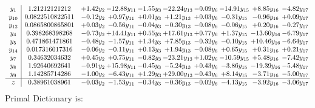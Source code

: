 \documentclass[9pt]{article}
\begin{document}
\[\begin{array}{c| c c@{\hskip 2pt} c@{\hskip 2pt} c@{\hskip 2pt} c@{\hskip 2pt} c@{\hskip 2pt} c@{\hskip 2pt} c@{\hskip 2pt} c@{\hskip 2pt} }
 y_{1}   &  1.21212121212 & +  1.42 y_{2} & -12.88 y_{11} & -1.55 y_{3} & -22.24 y_{13} & -0.09 y_{6} & -14.91 y_{15} & +  8.85 y_{16} & -4.82 y_{17}\\
 y_{10}   &  0.0822510822511 & -0.12 y_{2} & +  0.97 y_{11} & +  0.01 y_{3} & +  1.21 y_{13} & +  0.03 y_{6} & -0.31 y_{15} & -0.96 y_{16} & +  0.09 y_{17}\\
 y_{12}   &  0.0865800865801 & +  0.03 y_{2} & -0.56 y_{11} & -0.04 y_{3} & -0.30 y_{13} & -0.08 y_{6} & -0.06 y_{15} & +  0.20 y_{16} & -0.27 y_{17}\\
 y_{4}   &  0.398268398268 & -0.73 y_{2} & + 14.41 y_{11} & +  0.55 y_{3} & + 17.61 y_{13} & +  0.77 y_{6} & +  1.37 y_{15} & -13.60 y_{16} & -6.79 y_{17}\\
 y_{5}   &  0.471861471861 & -0.48 y_{2} & -1.57 y_{11} & +  1.34 y_{3} & +  7.85 y_{13} & -0.32 y_{6} & -0.10 y_{15} & + 10.46 y_{16} & -6.64 y_{17}\\
 y_{14}   &  0.017316017316 & -0.06 y_{2} & -0.11 y_{11} & +  0.13 y_{3} & +  1.94 y_{13} & -0.08 y_{6} & +  0.65 y_{15} & +  0.31 y_{16} & +  0.21 y_{17}\\
 y_{7}   &  0.34632034632 & +  0.45 y_{2} & +  0.75 y_{11} & -0.82 y_{3} & -23.21 y_{13} & +  1.02 y_{6} & -10.59 y_{15} & +  5.48 y_{16} & -7.42 y_{17}\\
 y_{8}   &  1.92640692641 & -0.91 y_{2} & + 15.98 y_{11} & -0.45 y_{3} & -5.24 y_{13} & +  0.43 y_{6} & -3.86 y_{15} & -19.39 y_{16} & -5.48 y_{17}\\
 y_{9}   &  1.14285714286 & -1.00 y_{2} & -6.43 y_{11} & +  1.29 y_{3} & + 29.00 y_{13} & -0.43 y_{6} & +  8.14 y_{15} & -3.71 y_{16} & -5.00 y_{17}\\
\hline
z    &  0.38961038961 & -0.03 y_{2} & -1.53 y_{11} & -0.34 y_{3} & -0.36 y_{13} & -0.02 y_{6} & -4.13 y_{15} & -3.92 y_{16} & -3.06 y_{17}\\
\end{array}\]
Primal Dictionary is:
\end{document}
